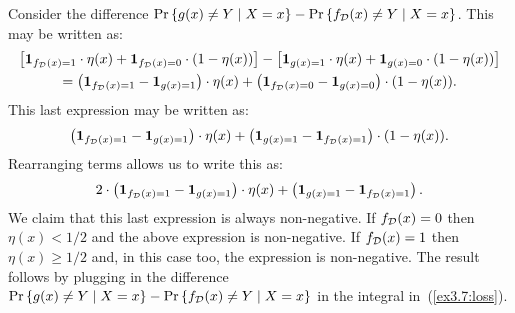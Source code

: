 Consider the difference $\text{Pr} \left \{ g(x) \neq Y \mid X = x \right \} - \text{Pr} \left \{ f_{\mathcal{D}}(x) \neq Y \mid X = x \right \}$.
This may be written as:
\begin{multline*}
\left [ \mathbf{1}_{f_{\mathcal{D}} (x) = 1} \cdot \eta (x)  + 
        \mathbf{1}_{f_{\mathcal{D}} (x) = 0} \cdot (1 - \eta (x)) \right ] - 
\left [ \mathbf{1}_{g(x) = 1} \cdot \eta (x)  + 
        \mathbf{1}_{g(x) = 0} \cdot (1 - \eta (x)) \right ]  \\
  = \left ( \mathbf{1}_{f_{\mathcal{D}} (x) = 1} - \mathbf{1}_{g(x) = 1} \right ) \cdot \eta(x) + 
  \left ( \mathbf{1}_{f_{\mathcal{D}} (x) = 0} - \mathbf{1}_{g(x) = 0} \right ) \cdot (1 - \eta(x)). 
\end{multline*}
This last expression may be written as:  
\[\left ( \mathbf{1}_{f_{\mathcal{D}} (x) = 1} - \mathbf{1}_{g(x) = 1} \right ) \cdot \eta(x) + 
  \left ( \mathbf{1}_{g (x) = 1} - \mathbf{1}_{f_{\mathcal{D}} (x) = 1} \right ) \cdot (1 - \eta(x)). 
\]
Rearranging terms allows us to write this as:
\begin{equation}
2 \cdot \left ( \mathbf{1}_{f_{\mathcal{D}} (x) = 1} - \mathbf{1}_{g(x) = 1} \right ) \cdot \eta(x) + 
  \left ( \mathbf{1}_{g (x) = 1} - \mathbf{1}_{f_{\mathcal{D}} (x) = 1} \right ). 
\end{equation}
We claim that this last expression is always non-negative. If $f_{\mathcal{D}} (x) = 0$ then
$\eta (x) < 1/2$ and the above expression is non-negative. If $f_{\mathcal{D}} (x) = 1$ then
$\eta (x) \geq 1/2$ and, in this case too, the expression is non-negative. The result
follows by plugging in the difference 
$\text{Pr} \left \{ g(x) \neq Y \mid X = x \right \} - \text{Pr} \left \{ f_{\mathcal{D}}(x) \neq Y \mid X = x \right \}$ 
in the integral in~(\ref{ex3.7:loss}).





